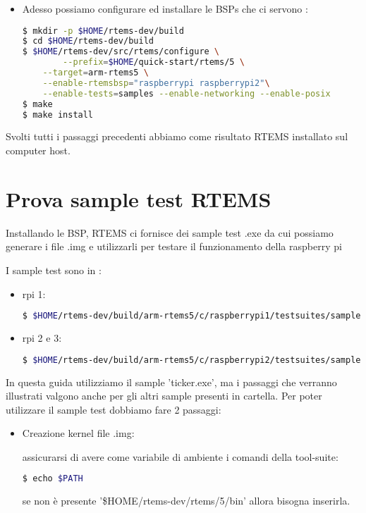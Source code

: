 \documentclass[10pt, a4paper]{article}
\begin{document}
\begin{flushleft}
\begin{itemize}
\item Adesso possiamo configurare ed installare le BSPs che ci servono  : 
\begin{lstlisting}[language=bash] 
$ mkdir -p $HOME/rtems-dev/build
$ cd $HOME/rtems-dev/build
$ $HOME/rtems-dev/src/rtems/configure \
        --prefix=$HOME/quick-start/rtems/5 \
	--target=arm-rtems5 \
	--enable-rtemsbsp="raspberrypi raspberrypi2"\
	--enable-tests=samples --enable-networking --enable-posix
$ make
$ make install	
\end{lstlisting}
		
\end{itemize}

Svolti tutti i passaggi precedenti abbiamo come risultato RTEMS installato sul computer host.
\newpage
\section{Prova sample test RTEMS}

Installando le BSP, RTEMS ci fornisce dei sample test .exe da cui possiamo generare i file .img e utilizzarli per testare il funzionamento della raspberry pi

I sample test sono in : 
\begin{itemize}
\item  rpi 1:
\begin{lstlisting}[language=bash] 
$ $HOME/rtems-dev/build/arm-rtems5/c/raspberrypi1/testsuites/samples
\end{lstlisting}
\item  rpi 2 e 3:
\begin{lstlisting}[language=bash] 
$ $HOME/rtems-dev/build/arm-rtems5/c/raspberrypi2/testsuites/samples
\end{lstlisting}
\end{itemize}

In questa guida utilizziamo il sample 'ticker.exe', ma i passaggi che verranno illustrati valgono anche per gli altri sample presenti in cartella.
Per poter utilizzare il sample test dobbiamo fare 2 passaggi:
\begin{itemize}
\item Creazione kernel file .img:

assicurarsi di avere come variabile di ambiente i comandi della tool-suite:
\begin{lstlisting}[language=bash] 
$ echo $PATH
\end{lstlisting}
se non è presente  '\$HOME/rtems-dev/rtems/5/bin' allora bisogna inserirla.


\end{itemize}
\end{flushleft}
\end{document}
